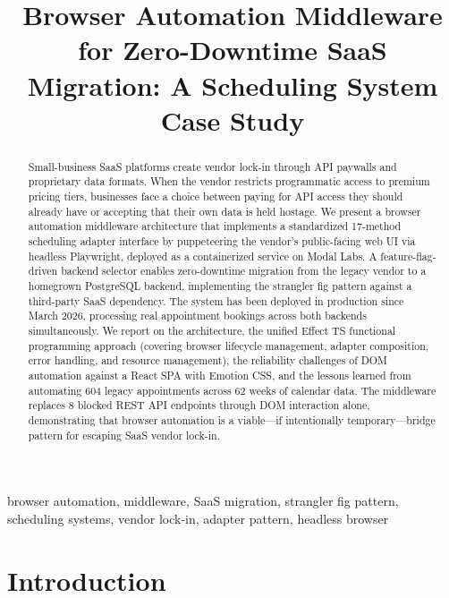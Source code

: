 \documentclass[conference]{IEEEtran}
\begin{document}
\title{Browser Automation Middleware for Zero-Downtime SaaS Migration: A Scheduling System Case Study}

\author{
}

\maketitle

\begin{abstract}
Small-business SaaS platforms create vendor lock-in through API paywalls and proprietary data formats. When the vendor restricts programmatic access to premium pricing tiers, businesses face a choice between paying for API access they should already have or accepting that their own data is held hostage. We present a browser automation middleware architecture that implements a standardized 17-method scheduling adapter interface by puppeteering the vendor's public-facing web UI via headless Playwright, deployed as a containerized service on Modal Labs. A feature-flag-driven backend selector enables zero-downtime migration from the legacy vendor to a homegrown PostgreSQL backend, implementing the strangler fig pattern against a third-party SaaS dependency. The system has been deployed in production since March 2026, processing real appointment bookings across both backends simultaneously. We report on the architecture, the unified Effect TS functional programming approach (covering browser lifecycle management, adapter composition, error handling, and resource management), the reliability challenges of DOM automation against a React SPA with Emotion CSS, and the lessons learned from automating 604 legacy appointments across 62 weeks of calendar data. The middleware replaces 8 blocked REST API endpoints through DOM interaction alone, demonstrating that browser automation is a viable---if intentionally temporary---bridge pattern for escaping SaaS vendor lock-in.
\end{abstract}

\begin{IEEEkeywords}
browser automation, middleware, SaaS migration, strangler fig pattern, scheduling systems, vendor lock-in, adapter pattern, headless browser
\end{IEEEkeywords}

\section{Introduction}
\end{document}

